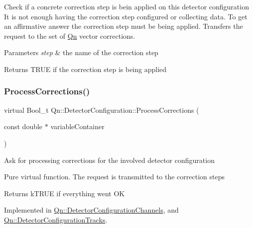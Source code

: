 Check if a concrete correction step is bein applied on this detector configuration It is not enough having the correction step configured or collecting data. To get an affirmative answer the correction step must be being applied. Transfers the request to the set of \mbox{\hyperlink{namespaceQn}{Qn}} vector corrections. 
\begin{DoxyParams}{Parameters}
{\em step} & the name of the correction step \\
\hline
\end{DoxyParams}
\begin{DoxyReturn}{Returns}
T\+R\+UE if the correction step is being applied 
\end{DoxyReturn}
\mbox{\label{classQn_1_1DetectorConfiguration_aad0610bd5d168c29a32025ddf641e3fc}} 
\subsubsection{\texorpdfstring{Process\+Corrections()}{ProcessCorrections()}}
{\footnotesize\ttfamily virtual Bool\+\_\+t Qn\+::\+Detector\+Configuration\+::\+Process\+Corrections (\begin{DoxyParamCaption}\item[{const double $\ast$}]{variable\+Container }\end{DoxyParamCaption})\hspace{0.3cm}{\ttfamily [pure virtual]}}

Ask for processing corrections for the involved detector configuration

Pure virtual function. The request is transmitted to the correction steps \begin{DoxyReturn}{Returns}
k\+T\+R\+UE if everything went OK 
\end{DoxyReturn}


Implemented in \mbox{\hyperlink{classQn_1_1DetectorConfigurationChannels_a327a2d868d9cc1596e83f54354c3df44}{Qn\+::\+Detector\+Configuration\+Channels}}, and \mbox{\hyperlink{classQn_1_1DetectorConfigurationTracks_a14705aef0b98cfe6d2b20c51676bcc0a}{Qn\+::\+Detector\+Configuration\+Tracks}}.

\mbox{\label{classQn_1_1DetectorConfiguration_ac78ed44b460217fda7d094cc102504c4}} 
